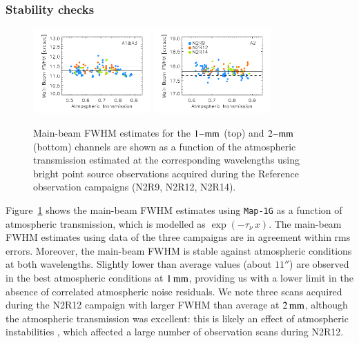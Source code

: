 \documentclass[traditionalabstract]{aa}
\newcommand{\taunu}{\tau_{\nu}}
\begin{document}
{\subsubsection{Stability checks}
\label{se:mainbeam_stability}

\begin{figure}[!thbp]
\begin{center}
  \includegraphics[clip, width=0.4\textwidth]{Figures/plot_FWHM_vs_atmtrans_mb_radius_binning2_1mm.pdf}
  \includegraphics[clip, width=0.4\textwidth]{Figures/plot_FWHM_vs_atmtrans_mb_radius_binning2_a2.pdf}
  \caption[Main Beam FWHM]{Main-beam FWHM estimates for the
    $1\rm{-mm}$ (top) and $2\rm{-mm}$ (bottom) channels are shown as
    a function of the atmospheric transmission estimated at the
    corresponding wavelengths using bright point source observations
  acquired during the Reference observation campaigns (N2R9, N2R12, N2R14).}
\label{fig:fwhm_map_atmtrans}
\end{center}
\end{figure}

Figure~\ref{fig:fwhm_map_atmtrans} shows the main-beam FWHM estimates
using {\tt Map-1G} as a function of atmospheric transmission,
which is modelled as $\exp{\left(-\taunu \, x\right)}$. 
The main-beam FWHM estimates using data of the three campaigns are in
agreement within rms errors. Moreover, the main-beam FWHM is stable
against atmospheric conditions at both wavelengths. Slightly lower than average values (about $11''$) are observed in the best
atmospheric conditions at $1\,\rm{mm}$, providing us with a lower limit
in the absence of correlated atmospheric noise residuals. We note
three scans acquired during the N2R12 campaign with larger FWHM than average at
$2\,\rm{mm}$, although the atmospheric transmission was excellent: this
is likely an effect of atmospheric instabilities%
, which affected a large number of observation scans during N2R12. 

}
\end{document}
